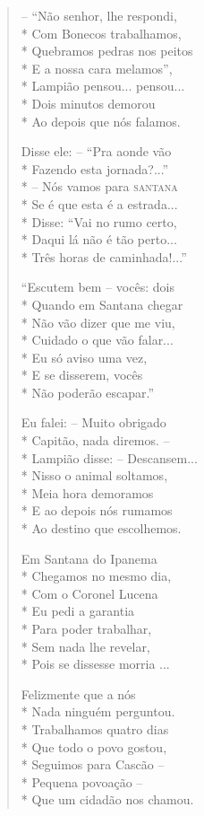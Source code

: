\begin{verse}
--  ``Não senhor, lhe respondi,\\*
Com Bonecos trabalhamos,\\*
Quebramos pedras nos peitos\\*
E a nossa cara melamos'',\\*
Lampião pensou... pensou...\\*
Dois minutos demorou\\*
Ao depois que nós falamos.

Disse ele: --  ``Pra aonde vão\\*
Fazendo esta jornada?...''\\*
--  Nós vamos para \textsc{santana}\\*
Se é que esta é a estrada...\\*
Disse: ``Vai no rumo certo,\\*
Daqui lá não é tão perto...\\*
Três horas de caminhada!...''

``Escutem bem --  vocês: dois\\*
Quando em Santana chegar\\*
Não vão dizer que me viu,\\*
Cuidado o que vão falar...\\*
Eu só aviso uma vez,\\*
E se disserem, vocês\\*
Não poderão escapar.''

Eu falei: --  Muito obrigado\\*
Capitão, nada diremos. --\\*
Lampião disse: --  Descansem...\\*
Nisso o animal soltamos,\\*
Meia hora demoramos\\*
E ao depois nós rumamos\\*
Ao destino que escolhemos.

Em Santana do Ipanema\\*
Chegamos no mesmo dia,\\*
Com o Coronel Lucena\\*
Eu pedi a garantia\\*
Para poder trabalhar,\\*
Sem nada lhe revelar,\\*
Pois se dissesse morria ...

Felizmente que a nós\\*
Nada ninguém perguntou.\\*
Trabalhamos quatro dias\\*
Que todo o povo gostou,\\*
Seguimos para Cascão --\\*
Pequena povoação --\\*
Que um cidadão nos chamou.


\end{verse}
